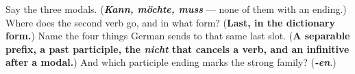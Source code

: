 \begin{tcolorbox}[breakable,colback=teal!4,colframe=teal!35!black,title={Before you move on}]
Say the three modals. (\emph{\textbf{Kann, möchte, muss}} — none of them with an ending.) Where does the second verb go, and in what form? (\textbf{Last, in the dictionary form.}) Name the four things German sends to that same last slot. (\textbf{A separable prefix, a past participle, the \emph{nicht} that cancels a verb, and an infinitive after a modal.}) And which participle ending marks the strong family? (\emph{\textbf{-en}}.)
\end{tcolorbox}
